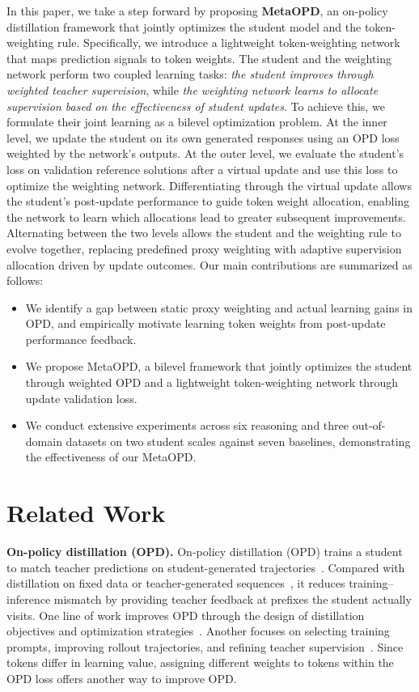 \documentclass{article}
\theoremstyle{plain}
\theoremstyle{definition}
\theoremstyle{remark}
\begin{document}
In this paper, we take a step forward by proposing \textbf{MetaOPD}, an on-policy distillation framework that jointly optimizes the student model and the token-weighting rule. Specifically, we introduce a lightweight token-weighting network that maps prediction signals to token weights. The student and the weighting network perform two coupled learning tasks: \textit{the student improves through weighted teacher supervision}, while \textit{the weighting network learns to allocate supervision based on the effectiveness of student updates}. To achieve this, we formulate their joint learning as a bilevel optimization problem. At the inner level, we update the student on its own generated responses using an OPD loss weighted by the network's outputs. At the outer level, we evaluate the student's loss on validation reference solutions after a virtual update and use this loss to optimize the weighting network. Differentiating through the virtual update allows the student's post-update performance to guide token weight allocation, enabling the network to learn which allocations lead to greater subsequent improvements. Alternating between the two levels allows the student and the weighting rule to evolve together, replacing predefined proxy weighting with adaptive supervision allocation driven by update outcomes. Our main contributions are summarized as follows:
\begin{itemize}
    \item We identify a gap between static proxy weighting and actual learning gains in OPD, and empirically motivate learning token weights from post-update performance feedback.
    \item We propose MetaOPD, a bilevel framework that jointly optimizes the student through weighted OPD and a lightweight token-weighting network through update validation loss.
    \item We conduct extensive experiments across six reasoning and three out-of-domain datasets on two student scales against seven baselines, demonstrating the effectiveness of our MetaOPD.
\end{itemize}




\section{Related Work}

\textbf{On-policy distillation (OPD).}
On-policy distillation (OPD) trains a student to match teacher predictions on student-generated trajectories~\citep{agarwal2024policy}.
Compared with distillation on fixed data or teacher-generated sequences~\citep{hinton2015distilling,kim2016sequence}, it reduces training--inference mismatch by providing teacher feedback at prefixes the student actually visits.
One line of work improves OPD through the design of distillation objectives and optimization strategies~\citep{gu2024minillm,ko2024distillm,yang2026learning,yu2026mismatch}.
Another focuses on selecting training prompts, improving rollout trajectories, and refining teacher supervision~\citep{li2026rethinking,xu2026pass,qu2026spot}.
Since tokens differ in learning value, assigning different weights to tokens within the OPD loss offers another way to improve OPD.
\end{document}
